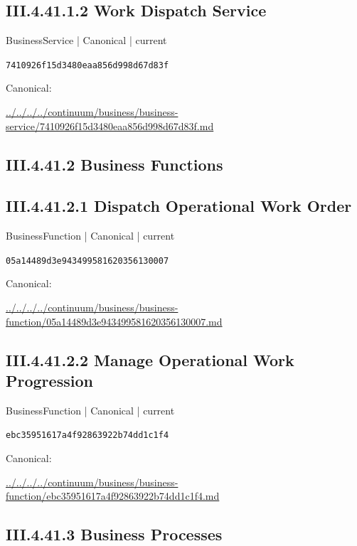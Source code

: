 \documentclass[10pt,a4paper]{article}
\begin{document}
\subsection*{III.4.41.1.2 Work Dispatch Service}
{\small BusinessService | Canonical | current}\par
\texttt{7410926f15d3480eaa856d998d67d83f}\par
Canonical: \par
{\footnotesize\url{../../../../continuum/business/business-service/7410926f15d3480eaa856d998d67d83f.md}}\par
\subsection*{III.4.41.2 Business Functions}
\subsection*{III.4.41.2.1 Dispatch Operational Work Order}
{\small BusinessFunction | Canonical | current}\par
\texttt{05a14489d3e943499581620356130007}\par
Canonical: \par
{\footnotesize\url{../../../../continuum/business/business-function/05a14489d3e943499581620356130007.md}}\par
\subsection*{III.4.41.2.2 Manage Operational Work Progression}
{\small BusinessFunction | Canonical | current}\par
\texttt{ebc35951617a4f92863922b74dd1c1f4}\par
Canonical: \par
{\footnotesize\url{../../../../continuum/business/business-function/ebc35951617a4f92863922b74dd1c1f4.md}}\par
\subsection*{III.4.41.3 Business Processes}
\end{document}
